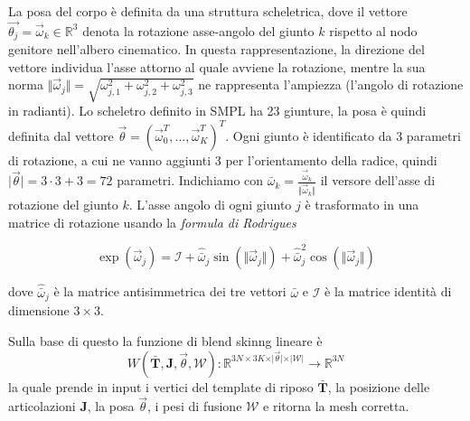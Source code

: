 \medskip
La posa del corpo è definita da una struttura scheletrica, dove il vettore $\vec{\theta_j} = \vec{\omega}_k \in \mathbb{R}^3$ denota la rotazione asse-angolo del giunto $k$ rispetto al nodo genitore nell'albero cinematico.
In questa rappresentazione, la direzione del vettore individua l'asse attorno al quale avviene la rotazione, mentre la sua norma $\Vert \vec{\omega}_j \Vert = \sqrt{\omega_{j,1}^2 + \omega_{j,2}^2 + \omega_{j,3}^2}$ ne rappresenta l'ampiezza (l'angolo di rotazione in radianti).
Lo scheletro definito in SMPL ha 23 giunture, la posa è quindi definita dal vettore $\vec{\theta} = (\vec{\omega}_0^T, \dots, \vec{\omega}_K^T)^T$.
Ogni giunto è identificato da 3 parametri di rotazione, a cui ne vanno aggiunti 3 per l'orientamento della radice, quindi $\vert \vec{\theta} \vert = 3 \cdot 3 + 3 = 72$ parametri.
Indichiamo con $\displaystyle \bar{\omega}_k = \frac{\vec{\omega}_k}{\Vert \vec{\omega}_k \Vert}$ il versore dell'asse di rotazione del giunto $k$.
L'asse angolo di ogni giunto $j$ è trasformato in una matrice di rotazione usando la \emph{formula di Rodrigues}

\begin{equation}
    \exp(\vec{\omega}_j) = \mathcal{I} + \hat{\bar{\omega}}_j \sin(\Vert \vec{\omega}_j \Vert) + \hat{\bar{\omega}}_j^2 \cos(\Vert \vec{\omega}_j \Vert)
\end{equation}

dove $\hat{\bar{\omega}}_j$ è la matrice antisimmetrica dei tre vettori $\bar{\omega}$ e $\mathcal{I}$ è la matrice identità di dimensione $3 \times 3$.

Sulla base di questo la funzione di blend skinng lineare è
\begin{equation}
    W(\bar{\mathbf{T}}, \mathbf{J}, \vec{\theta}, \mathcal{W}): \mathbb{R}^{3N \times 3K \times \vert \vec{\theta} \vert \times \vert \mathcal{W} \vert} \to \mathbb{R}^{3N} 
\end{equation}
la quale prende in input i vertici del template di riposo $\bar{\mathbf{T}}$, la posizione delle articolazioni $\mathbf{J}$, la posa $\vec{\theta}$, i pesi di fusione $\mathcal{W}$ e ritorna la mesh corretta. %

